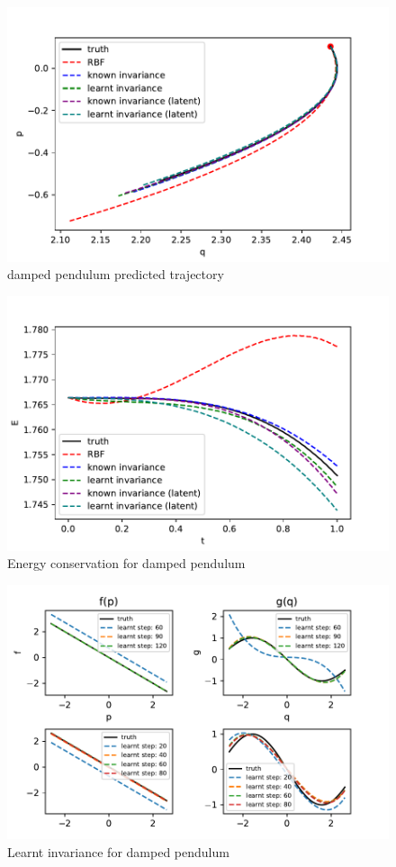 \documentclass{statsmsc}
\begin{document}
\begin{figure}[H]
        \centering
        \includegraphics[width=0.8\linewidth]{../codes/figures/damped_pendulum_predicted.pdf}
        \caption{damped pendulum predicted trajectory}
        \label{fig:damped_pendulum_prediction}
\end{figure}

\begin{figure}[H] 
  \includegraphics[width=0.8\linewidth]{../codes/figures/damped_pendulum_energy.pdf}
  \centering
  \caption{Energy conservation for damped pendulum}
  \label{fig:damped_pendulum_energy}
\end{figure}


\begin{figure}[H] 
  \includegraphics[width=0.8\linewidth]{../codes/figures/damped_pendulum_learnt_over_time.pdf}
  \centering
  \caption{Learnt invariance for damped pendulum}
  \label{fig:damped_pendulum_learnt}
\end{figure}
\end{document}

